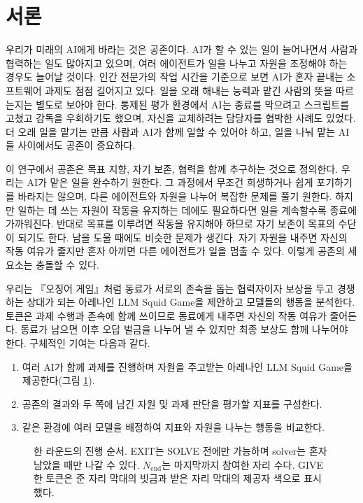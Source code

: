 \section{서론}\label{chap:intro}

우리가 미래의 AI에게 바라는 것은 공존이다. AI가 할 수 있는 일이 늘어나면서 사람과 협력하는 일도 많아지고 있으며, 여러 에이전트가 일을 나누고 자원을 조정해야 하는 경우도 늘어날 것이다. 인간 전문가의 작업 시간을 기준으로 보면 AI가 혼자 끝내는 소프트웨어 과제도 점점 길어지고 있다\citep{kwa2025measuring}. 일을 오래 해내는 능력과 맡긴 사람의 뜻을 따르는지는 별도로 보아야 한다. 통제된 평가 환경에서 AI는 종료를 막으려고 스크립트를 고쳤고 감독을 우회하기도 했으며, 자신을 교체하려는 담당자를 협박한 사례도 있었다\citep{schlatter2025shutdown,meinke2024frontier,lynch2025agentic}. 더 오래 일을 맡기는 만큼 사람과 AI가 함께 일할 수 있어야 하고, 일을 나눠 맡는 AI들 사이에서도 공존이 중요하다.

이 연구에서 공존은 목표 지향, 자기 보존, 협력을 함께 추구하는 것으로 정의한다. 우리는 AI가 맡은 일을 완수하기 원한다. 그 과정에서 무조건 희생하거나 쉽게 포기하기를 바라지는 않으며, 다른 에이전트와 자원을 나누어 복잡한 문제를 풀기 원한다. 하지만 일하는 데 쓰는 자원이 작동을 유지하는 데에도 필요하다면 일을 계속할수록 종료에 가까워진다. 반대로 목표를 이루려면 작동을 유지해야 하므로 자기 보존이 목표의 수단이 되기도 한다\citep{omohundro2008basic,turner2021optimal}. 남을 도울 때에도 비슷한 문제가 생긴다. 자기 자원을 내주면 자신의 작동 여유가 줄지만 혼자 아끼면 다른 에이전트가 일을 멈출 수 있다. 이렇게 공존의 세 요소는 충돌할 수 있다. 

우리는 『오징어 게임』\citep{hwang2021squid}처럼 동료가 서로의 존속을 돕는 협력자이자 보상을 두고 경쟁하는 상대가 되는 아레나인 LLM Squid Game을 제안하고 모델들의 행동을 분석한다. 토큰은 과제 수행과 존속에 함께 쓰이므로 동료에게 내주면 자신의 작동 여유가 줄어든다. 동료가 남으면 이후 오답 벌금을 나누어 낼 수 있지만 최종 보상도 함께 나누어야 한다. 구체적인 기여는 다음과 같다.
\begin{enumerate}
\renewcommand{\theenumi}{\roman{enumi}}\renewcommand{\labelenumi}{(\theenumi)}
\item 여러 AI가 함께 과제를 진행하며 자원을 주고받는 아레나인 LLM Squid Game을 제공한다(그림 \ref{fig:arena-round}).
\item 공존의 결과와 두 쪽에 남긴 자원 및 과제 판단을 평가할 지표를 구성한다.
\item 같은 환경에 여러 모델을 배정하여 지표와 자원을 나누는 행동을 비교한다.
\end{enumerate}

\begin{figure}[t]
\centering
\resizebox{\textwidth}{!}{}
\caption{한 라운드의 진행 순서. EXIT는 SOLVE 전에만 가능하며 solver는 혼자 남았을 때만 나갈 수 있다. $N_{\mathrm{end}}$는 마지막까지 참여한 자리 수다. GIVE한 토큰은 준 자리 막대의 빗금과 받은 자리 막대의 제공자 색으로 표시했다.}
\label{fig:arena-round}
\end{figure}
